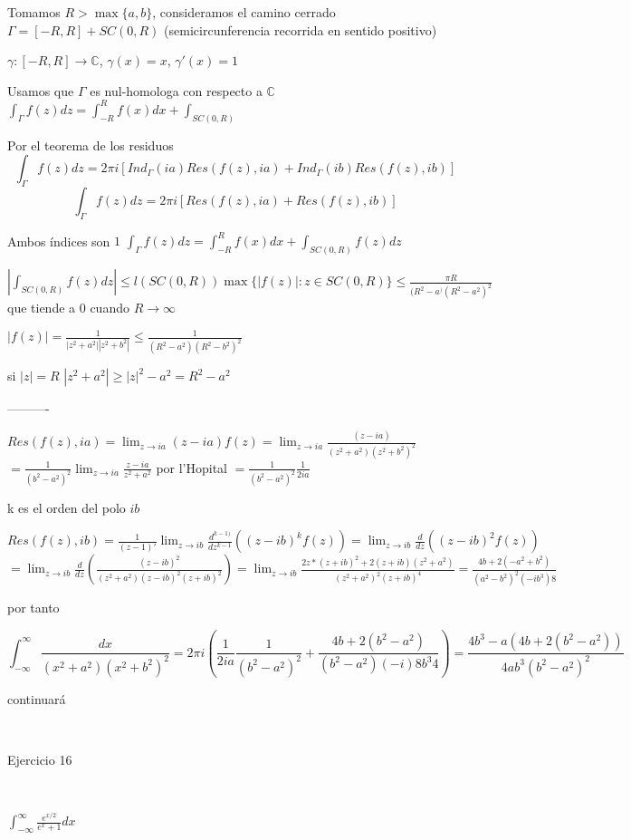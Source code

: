 Tomamos $R>\max\{a,b\}$, consideramos el camino cerrado $\Gamma = [-R,R]+SC(0,R)$ (semicircunferencia recorrida en sentido positivo)

$\gamma : [-R,R]\rightarrow \mathbb{C}$, $\gamma(x)=x$, $\gamma '(x) = 1$

Usamos que $\Gamma$ es nul-homologa con respecto a $\mathbb{C}$
$\int_{\Gamma}f(z)dz = \int_{-R}^{R} f(x)dx + \int_{SC(0,R)}$

Por el teorema de los residuos 
$$\int_{\Gamma}f(z)dz = 2\pi i [ Ind_{\Gamma}(ia)Res(f(z),ia) + Ind_{\Gamma}(ib)Res(f(z),ib) ]$$
$$\int_{\Gamma}f(z)dz = 2\pi i [Res(f(z),ia) + Res(f(z),ib) ]$$

Ambos índices son $1$
$\int_{\Gamma}f(z)dz = \int_{-R}^{R} f(x)dx + \int_{SC(0,R)} f(z)dz$


$|\int_{SC(0,R)} f(z)dz| \leq l(SC(0,R))\max \{ |f(z)| : z\in SC(0,R) \} \leq \frac{\pi R}{(R^2-a^)(R^2-a^2)^2}$
que tiende a $0$ cuando $R\rightarrow \infty$

$|f(z)| = \frac{1}{|z^2+a^2||z^2+b^2|} \leq \frac{1}{(R^2-a^2)(R^2-b^2)^2}$

si $|z|=R$
$|z^2+a^2| \geq |z|^2 -a^2 = R^2-a^2$

----------

$Res(f(z),ia) = \lim_{z\rightarrow ia} (z-ia)f(z) = \lim_{z\rightarrow ia} \frac{(z-ia)}{(z^2+a^2)(z^2+b^2)^2} $
$= \frac{1}{(b^2-a^2)^2} \lim_{z\rightarrow ia} \frac{z-ia}{z^2+a^2}$ 
por l'Hopital
$= \frac{1}{(b^2-a^2)^2}\frac{1}{2ia}$

k es el orden del polo $ib$

$Res(f(z),ib) = \frac{1}{(z-1)'} \lim_{z\rightarrow ib} \frac{d^{k-1)}}{dz^{k-1}} ((z-ib)^k f(z)) = \lim_{z\rightarrow ib} \frac{d}{dz} ((z-ib)^2 f(z)) $
$= \lim_{z\rightarrow ib} \frac{d}{dz} \left( \frac{(z-ib)^2}{(z^2+a^2)(z-ib)^2(z+ib)^2}  \right) 
= \lim_{z\rightarrow ib}\frac{2z*(z+ib)^2 + 2(z+ib)(z^2+a^2)}{(z^2+a^2)^2 (z+ib)^4}
= \frac{4b + 2(-a^2+b^2)}{(a^2-b^2)^2 (-ib^3)8}  $

por tanto

$$ \int_{-\infty}^{\infty} \frac{dx}{(x^2+a^2)(x^2+b^2)^2} = 
2\pi i \left( \frac{1}{2ia}\frac{1}{(b^2-a^2)^2} + \frac{4b+2(b^2-a^2)}{(b^2-a^2)(-i)8b^3 4} \right) =
\frac{4b^3-a(4b+2(b^2-a^2))}{4ab^3(b^2-a^2)^2}$$

continuará

\

Ejercicio 16

\

$\int_{-\infty}^{\infty} \frac{e^{x/2}}{e^x+1}dx$

